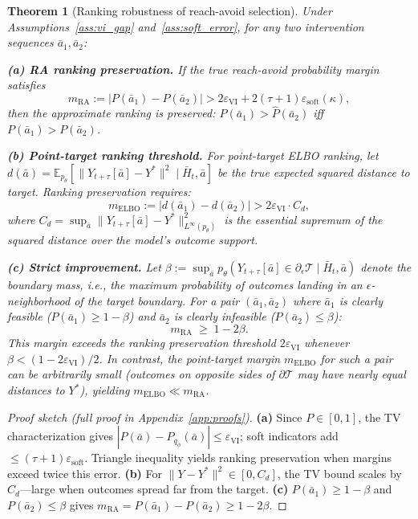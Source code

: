\documentclass{article}
\newtheorem{theorem}{Theorem}
\newcommand{\E}{\mathbb{E}}
\newcommand{\bH}{\bar{H}}
\newcommand{\ba}{\bar{a}}
\newcommand{\cT}{\mathcal{T}}
\begin{document}
\begin{theorem}[Ranking robustness of reach-avoid selection]
\label{thm:ranking_robustness}
Under Assumptions~\ref{ass:vi_gap} and~\ref{ass:soft_error}, for any two intervention sequences $\ba_1, \ba_2$:

\textbf{(a) RA ranking preservation.} If the true reach-avoid probability margin satisfies
\begin{equation}
\label{eq:ra_margin}
m_{\mathrm{RA}} := |P(\ba_1) - P(\ba_2)| > 2\varepsilon_{\mathrm{VI}} + 2(\tau+1)\varepsilon_{\mathrm{soft}}(\kappa),
\end{equation}
then the approximate ranking is preserved: $\hat{P}(\ba_1) > \hat{P}(\ba_2)$ iff $P(\ba_1) > P(\ba_2)$.

\textbf{(b) Point-target ranking threshold.} For point-target ELBO ranking, let $d(\ba) = \E_{p_\theta}[\|Y_{t+\tau}[\ba] - Y^*\|^2 \mid \bH_t, \ba]$ be the true expected squared distance to target. Ranking preservation requires:
\begin{equation}
\label{eq:elbo_margin}
m_{\mathrm{ELBO}} := |d(\ba_1) - d(\ba_2)| > 2\varepsilon_{\mathrm{VI}} \cdot C_d,
\end{equation}
where $C_d = \sup_{\ba} \|Y_{t+\tau}[\ba] - Y^*\|^2_{L^\infty(p_\theta)}$ is the essential supremum of the squared distance over the model's outcome support.

\textbf{(c) Strict improvement.} Let $\beta := \sup_{\ba} p_\theta(Y_{t+\tau}[\ba] \in \partial_\epsilon \cT \mid \bH_t, \ba)$ denote the boundary mass, i.e., the maximum probability of outcomes landing in an $\epsilon$-neighborhood of the target boundary. For a pair $(\ba_1, \ba_2)$ where $\ba_1$ is clearly feasible ($P(\ba_1) \geq 1 - \beta$) and $\ba_2$ is clearly infeasible ($P(\ba_2) \leq \beta$):
\begin{equation}
\label{eq:ra_margin_quantitative}
m_{\mathrm{RA}} \;\geq\; 1 - 2\beta.
\end{equation}
This margin exceeds the ranking preservation threshold $2\varepsilon_{\mathrm{VI}}$ whenever $\beta < (1 - 2\varepsilon_{\mathrm{VI}})/2$. In contrast, the point-target margin $m_{\mathrm{ELBO}}$ for such a pair can be arbitrarily small (outcomes on opposite sides of $\partial\cT$ may have nearly equal distances to $Y^*$), yielding $m_{\mathrm{ELBO}} \ll m_{\mathrm{RA}}$.
\end{theorem}

\begin{proof}[Proof sketch (full proof in Appendix~\ref{app:proofs})]
\textbf{(a)} Since $P \in [0,1]$, the TV characterization gives $|P(\ba) - P_{q_\phi}(\ba)| \leq \varepsilon_{\mathrm{VI}}$; soft indicators add $\leq (\tau{+}1)\varepsilon_{\mathrm{soft}}$. Triangle inequality yields ranking preservation when margins exceed twice this error. \textbf{(b)} For $\|Y{-}Y^*\|^2 \in [0, C_d]$, the TV bound scales by $C_d$---large when outcomes spread far from the target. \textbf{(c)} $P(\ba_1) \geq 1 - \beta$ and $P(\ba_2) \leq \beta$ gives $m_{\mathrm{RA}} = P(\ba_1) - P(\ba_2) \geq 1 - 2\beta$.
\end{proof}
\end{document}

